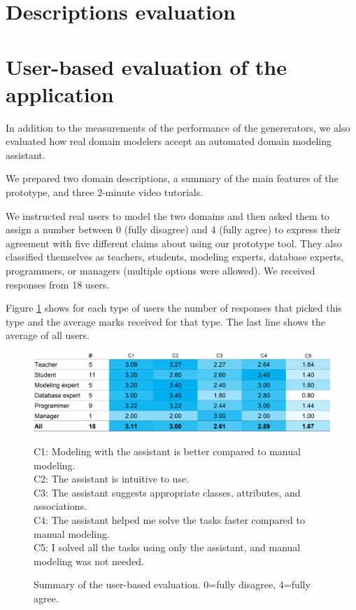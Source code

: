 \section{Descriptions evaluation}


\section{User-based evaluation of the application}

In addition to the measurements of the performance of the genererators, we also evaluated how real domain modelers accept an automated domain modeling assistant.

We prepared two domain descriptions, a summary of the main features of the prototype, and three 2-minute video tutorials.

We instructed real users to model the two domains and then asked them to assign a number between 0 (fully disagree) and 4 (fully agree) to express their agreement with five different claims about using our prototype tool.
They also classified themselves as teachers, students, modeling experts, database experts, programmers, or managers (multiple options were allowed).
We received responses from 18 users.

Figure \ref{fig:user-based-evaluation} shows for each type of users the number of responses that picked this type and the average marks received for that type. The last line shows the average of all users.

\begin{figure}[!h]
    \includegraphics[width=1\linewidth]{img/user-based-evaluation.png} \\
    \scriptsize
\raggedright{C1: Modeling with the assistant is better compared to manual modeling. \\
C2: The assistant is intuitive to use.\\
C3: The assistant suggests appropriate classes, attributes, and associations.\\
C4: The assistant helped me solve the tasks faster compared to manual modeling.\\
C5: I solved all the tasks using only the assistant, and manual modeling was not needed.}
    \caption{Summary of the user-based evaluation. 0=fully disagree, 4=fully agree.}
    \label{fig:user-based-evaluation}
\end{figure}

